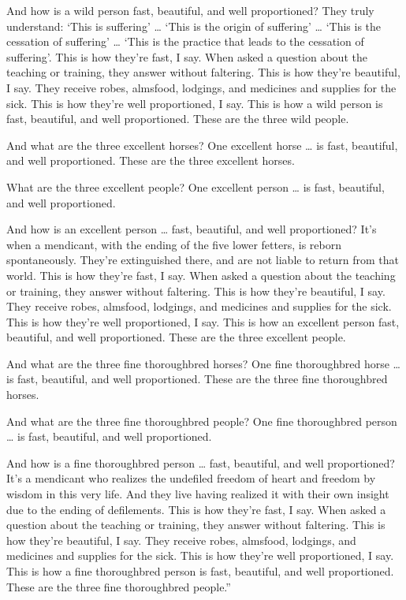 \documentclass[12pt,openany]{book}%
\begin{document}
And how is a wild person fast, beautiful, and well proportioned? They truly understand: ‘This is suffering’ … ‘This is the origin of suffering’ … ‘This is the cessation of suffering’ … ‘This is the practice that leads to the cessation of suffering’. This is how they’re fast, I say. When asked a question about the teaching or training, they answer without faltering. This is how they’re beautiful, I say. They receive robes, almsfood, lodgings, and medicines and supplies for the sick. This is how they’re well proportioned, I say. This is how a wild person is fast, beautiful, and well proportioned. These are the three wild people. 

And what are the three excellent horses? One excellent horse … is fast, beautiful, and well proportioned. These are the three excellent horses. 

What are the three excellent people? One excellent person … is fast, beautiful, and well proportioned. 

And how is an excellent person … fast, beautiful, and well proportioned? It’s when a mendicant, with the ending of the five lower fetters, is reborn spontaneously. They’re extinguished there, and are not liable to return from that world. This is how they’re fast, I say. When asked a question about the teaching or training, they answer without faltering. This is how they’re beautiful, I say. They receive robes, almsfood, lodgings, and medicines and supplies for the sick. This is how they’re well proportioned, I say. This is how an excellent person fast, beautiful, and well proportioned. These are the three excellent people. 

And what are the three fine thoroughbred horses? One fine thoroughbred horse … is fast, beautiful, and well proportioned. These are the three fine thoroughbred horses. 

And what are the three fine thoroughbred people? One fine thoroughbred person … is fast, beautiful, and well proportioned. 

And how is a fine thoroughbred person … fast, beautiful, and well proportioned? It’s a mendicant who realizes the undefiled freedom of heart and freedom by wisdom in this very life. And they live having realized it with their own insight due to the ending of defilements. This is how they’re fast, I say. When asked a question about the teaching or training, they answer without faltering. This is how they’re beautiful, I say. They receive robes, almsfood, lodgings, and medicines and supplies for the sick. This is how they’re well proportioned, I say. This is how a fine thoroughbred person is fast, beautiful, and well proportioned. These are the three fine thoroughbred people.” 
\end{document}
